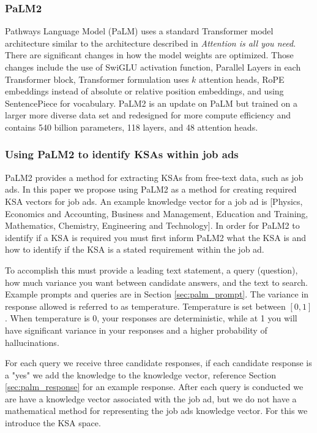 \documentclass[12pt]{article}
\begin{document}
\subsubsection{PaLM2}

Pathways Language Model (PaLM) uses a standard Transformer model architecture similar to the architecture described in \textit{Attention is all you need}.\cite{attention} There are significant changes in how the model weights are optimized. Those changes include the use of SwiGLU activation function, Parallel Layers in each Transformer block, Transformer formulation uses $k$ attention heads, RoPE embeddings instead of absolute or relative position embeddings, and using SentencePiece for vocabulary.\cite{palm} PaLM2 is an update on PaLM but trained on a larger more diverse data set and redesigned for more compute efficiency and contains 540 billion parameters, 118 layers, and 48 attention heads.\cite{palm2} 

\subsubsection{Using PaLM2 to identify KSAs within job ads}

PaLM2 provides a method for extracting KSAs from free-text data, such as job ads. In this paper we propose using PaLM2 as a method for creating required KSA vectors for job ads. An example knowledge vector for a job ad is [Physics, Economics and Accounting, Business and Management, Education and Training, Mathematics, Chemistry, Engineering and Technology]. In order for PaLM2 to identify if a KSA is required you must first inform PaLM2 what the KSA is and how to identify if the KSA is a stated requirement within the job ad. 

To accomplish this must provide a leading text statement, a query (question), how much variance you want between candidate answers, and the text to search. Example prompts and queries are in Section \ref{sec:palm_prompt}. The variance in response allowed is referred to as temperature. Temperature is set between $[0,1]$. When temperature is 0, your responses are deterministic, while at 1 you will have significant variance in your responses and a higher probability of hallucinations. 

For each query we receive three candidate responses, if each candidate response is a "yes" we add the knowledge to the knowledge vector, reference Section \ref{sec:palm_response} for an example response. After each query is conducted we are have a knowledge vector associated with the job ad, but we do not have a mathematical method for representing the job ads knowledge vector. For this we introduce the KSA space.
\end{document}
